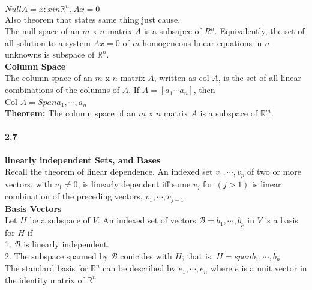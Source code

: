 \documentclass[14pt]{extreport}
\begin{document}
$Null A = {x: x in \mathbb{R}^n, Ax = 0}$\\

Also theorem that states same thing just cause.\\

The null space of an $m$ x $n$ matrix $A$ is a subsapce of $R^n$. Equivalently, the set of all solution to a system $Ax = 0$ of $m$ homogeneous linear equations in $n$ unknowns is subspace of $\mathbb{R}^n$.\\

\textbf{Column Space}\\

The column space of an $m$ x $n$ matrix $A$, written as col $A$, is the set of all linear combinations of the columns of $A$. If $A = [a_1 \cdots a_n]$, then\\

Col $A = Span{a_1,\cdots , a_n}$ \\

\textbf{Theorem: } The column space of an $m$ x $n$ matrix $A$ is a subspace of $\mathbb{R}^m$.\\

\paragraph{2.7} \textbf{ linearly independent Sets, and Bases}\\

Recall the theorem of linear dependence. An indexed set ${ v_1, \cdots, v_p}$ of two or more vectors, with $v_1 \ne 0$, is linearly dependent iff some $v_j$ for $(j > 1)$ is linear combination of the preceding vectors, $v_1, \cdots ,v_{j-1}$.\\

\textbf{Basis Vectors}\\

Let $H$ be a subspace of $V$. An indexed set of vectors $\mathcal{B} = {b_1, \cdots , b_p}$ in $V$ is a basis for $H$ if\\

1. $\mathcal{B}$ is linearly independent.\\
2. The subspace spanned by $\mathcal{B}$ conicides with $H$; that is,
    $H = span{b_1, \cdots, b_p}$\\

    The standard basis for $\mathbb{R}^n$ can be described by ${e_1, \cdots, e_n}$ where $e$ is a unit vector in the identity matrix of $\mathbb{R}^n$\\\\
\end{document}
